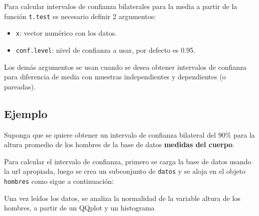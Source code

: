 \documentclass[10pt,]{krantz}
\makeatletter
\newenvironment{Shaded}{\begin{snugshade}}{\end{snugshade}}
\newcommand{\KeywordTok}[1]{\textcolor[rgb]{0.13,0.29,0.53}{\textbf{{#1}}}}
\newcommand{\DataTypeTok}[1]{\textcolor[rgb]{0.13,0.29,0.53}{{#1}}}
\newcommand{\DecValTok}[1]{\textcolor[rgb]{0.00,0.00,0.81}{{#1}}}
\newcommand{\StringTok}[1]{\textcolor[rgb]{0.31,0.60,0.02}{{#1}}}
\newcommand{\CommentTok}[1]{\textcolor[rgb]{0.56,0.35,0.01}{\textit{{#1}}}}
\newcommand{\OtherTok}[1]{\textcolor[rgb]{0.56,0.35,0.01}{{#1}}}
\newcommand{\NormalTok}[1]{{#1}}
\providecommand{\tightlist}{%
  \setlength{\itemsep}{0pt}\setlength{\parskip}{0pt}}
\newenvironment{kframe}{%
\medskip{}
\setlength{\fboxsep}{.8em}
 \def\at@end@of@kframe{}%
 \ifinner\ifhmode%
  \def\at@end@of@kframe{\end{minipage}}%
  \begin{minipage}{\columnwidth}%
 \fi\fi%
 \def\FrameCommand##1{\hskip\@totalleftmargin \hskip-\fboxsep
 \colorbox{shadecolor}{##1}\hskip-\fboxsep
     \hskip-\linewidth \hskip-\@totalleftmargin \hskip\columnwidth}%
 \MakeFramed {\advance\hsize-\width
   \@totalleftmargin\z@ \linewidth\hsize
   \@setminipage}}%
 {\par\unskip\endMakeFramed%
 \at@end@of@kframe}
\renewenvironment{Shaded}{\begin{kframe}}{\end{kframe}}
\makeatother
\begin{document}
Para calcular intervalos de confianza bilaterales para la media a partir
de la función \texttt{t.test} es necesario definir 2 argumentos:

\begin{itemize}
\tightlist
\item
  \texttt{x}: vector numérico con los datos.
\item
  \texttt{conf.level}: nivel de confianza a usar, por defecto es 0.95.
\end{itemize}

Los demás argumentos se usan cuando se desea obtener intervalos de
confianza para diferencia de media con muestras independientes y
dependientes (o pareadas).

\subsection*{Ejemplo}\label{ejemplo-53}


Suponga que se quiere obtener un intervalo de confianza bilateral del
90\% para la altura promedio de los hombres de la base de datos
\textbf{medidas del cuerpo}.

Para calcular el intervalo de confianza, primero se carga la base de
datos usando la url apropiada, luego se crea un subconjunto de
\texttt{datos} y se aloja en el objeto \texttt{hombres} como sigue a
continuación:

\begin{Shaded}
\end{Shaded}

Una vez leídos los datos, se analiza la normalidad de la variable altura
de los hombres, a partir de un QQplot y un histograma

\begin{Shaded}
\end{Shaded}
\end{document}
